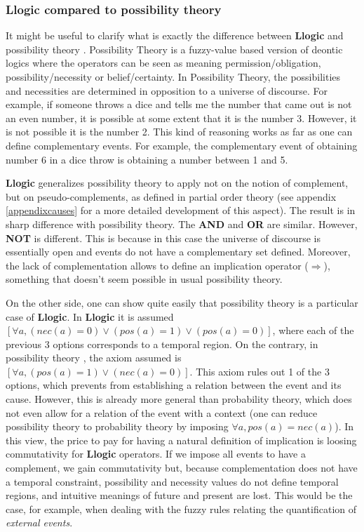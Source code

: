 \documentclass[
		twoside,openright,titlepage,numbers=noenddot,manychapters,
		headinclude,%
                footinclude=false,cleardoublepage=empty,
                BCOR=5mm,
		fontsize=11pt, %
                 enabledeprecatedfontcommands]{scrreprt}
\begin{document}
\subsubsection{Llogic compared to possibility theory}
\label{Llogic_vs_pos}
  It might be useful to clarify what is exactly the difference between  \textbf{Llogic} and possibility theory \cite[]{zadeh1999fuzzy}.
Possibility Theory is a fuzzy-value based version of deontic logics where the operators can be seen as meaning permission/obligation, possibility/necessity or belief/certainty. In Possibility Theory, the possibilities and necessities are determined in opposition to a universe of discourse. For example, if someone throws a dice and tells me the number that came out is not an even number, it is possible at some extent that it is the number 3.  However, it is not possible it is the number 2. This kind of reasoning works  as far as one can define complementary events. For example, the complementary event of obtaining number 6 in a dice throw is obtaining a number between 1 and 5.  

\textbf{Llogic} generalizes possibility theory to apply not on the notion of complement, but on pseudo-complements, as defined in partial order theory (see appendix \ref{appendixcauses} for a more detailed development of this aspect). The result is in sharp difference with possibility theory. The \textbf{AND} and \textbf{OR} are similar. However, \textbf{NOT} is different. This is because  in this case the universe of discourse is essentially open and events do not have a complementary set defined. Moreover, the lack of complementation allows to define an implication operator ($\Rightarrow$), something that doesn't seem possible in usual possibility theory.

On the other side, one can show quite easily that possibility theory is a particular case of \textbf{Llogic}. In \textbf{Llogic} it is assumed $ [ \forall a, (nec(a)=0) \vee (pos(a)=1)  \vee (pos(a)=0)]$, where each of the previous 3 options corresponds to a temporal region. On the contrary, in possibility theory \cite[]{zadeh1999fuzzy}, the axiom assumed is $ [ \forall a, (pos(a)=1) \vee (nec(a)=0)]$. This axiom rules out 1 of the 3 options, which prevents from establishing a relation between the event and its cause. However, this is already more general than probability theory, which does not even allow for a relation of the event with a context (one can reduce possibility theory to probability theory by imposing $\forall a, pos(a)=nec(a)$).
In this view, the price to pay for having a natural definition of implication is loosing commutativity for \textbf{Llogic} operators. If we impose all events to have a complement, we gain commutativity but, because complementation does not have a temporal constraint, possibility and necessity values do not define temporal regions, and  intuitive meanings of future and present are lost. This would be the case, for example, when dealing with the fuzzy rules relating the quantification of \emph{external events}.
   
\end{document}
